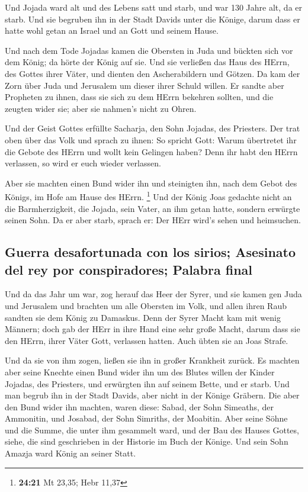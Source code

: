  Und Jojada ward alt und des Lebens satt und starb, und
war 130 Jahre alt, da er starb.  Und sie begruben ihn in
der Stadt Davids unter die Könige, darum dass er hatte wohl getan an
Israel und an Gott und seinem Hause.

 Und nach dem Tode Jojadas kamen die Obersten in Juda und
bückten sich vor dem König; da hörte der König auf sie. 
Und sie verließen das Haus des HErrn, des Gottes ihrer Väter, und
dienten den Ascherabildern und Götzen. Da kam der Zorn über Juda und
Jerusalem um dieser ihrer Schuld willen.  Er sandte aber
Propheten zu ihnen, dass sie sich zu dem HErrn bekehren sollten, und die
zeugten wider sie; aber sie nahmen's nicht zu Ohren.

 Und der Geist Gottes erfüllte Sacharja, den Sohn
Jojadas, des Priesters. Der trat oben über das Volk und sprach zu ihnen:
So spricht Gott: Warum übertretet ihr die Gebote des HErrn und wollt
kein Gelingen haben? Denn ihr habt den HErrn verlassen, so wird er euch
wieder verlassen.

 Aber sie machten einen Bund wider ihn und steinigten
ihn, nach dem Gebot des Königs, im Hofe am Hause des HErrn. \footnote{\textbf{24:21}
  Mt 23,35; Hebr 11,37}  Und der König Joas gedachte
nicht an die Barmherzigkeit, die Jojada, sein Vater, an ihm getan hatte,
sondern erwürgte seinen Sohn. Da er aber starb, sprach er: Der HErr
wird's sehen und heimsuchen.

\hypertarget{guerra-desafortunada-con-los-sirios-asesinato-del-rey-por-conspiradores-palabra-final}{%
\subsection{Guerra desafortunada con los sirios; Asesinato del rey por
conspiradores; Palabra
final}\label{guerra-desafortunada-con-los-sirios-asesinato-del-rey-por-conspiradores-palabra-final}}

 Und da das Jahr um war, zog herauf das Heer der Syrer,
und sie kamen gen Juda und Jerusalem und brachten um alle Obersten im
Volk, und allen ihren Raub sandten sie dem König zu Damaskus.
 Denn der Syrer Macht kam mit wenig Männern; doch gab der
HErr in ihre Hand eine sehr große Macht, darum dass sie den HErrn, ihrer
Väter Gott, verlassen hatten. Auch übten sie an Joas Strafe.

 Und da sie von ihm zogen, ließen sie ihn in großer
Krankheit zurück. Es machten aber seine Knechte einen Bund wider ihn um
des Blutes willen der Kinder Jojadas, des Priesters, und erwürgten ihn
auf seinem Bette, und er starb. Und man begrub ihn in der Stadt Davids,
aber nicht in der Könige Gräbern.  Die aber den Bund
wider ihn machten, waren diese: Sabad, der Sohn Simeaths, der Ammonitin,
und Josabad, der Sohn Simriths, der Moabitin.  Aber seine
Söhne und die Summe, die unter ihm gesammelt ward, und der Bau des
Hauses Gottes, siehe, die sind geschrieben in der Historie im Buch der
Könige. Und sein Sohn Amazja ward König an seiner Statt.

